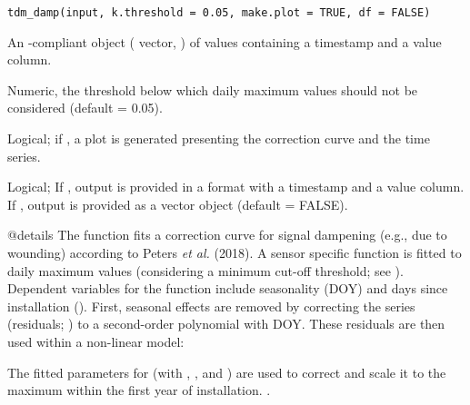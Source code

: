 \documentclass[a4paper]{book}
\begin{document}
%
\begin{Usage}
\begin{verbatim}
tdm_damp(input, k.threshold = 0.05, make.plot = TRUE, df = FALSE)
\end{verbatim}
\end{Usage}
%
\begin{Arguments}
\begin{ldescription}
\item[\code{input}] An -compliant object ( vector, ) of  values containing
a timestamp and a value column.

\item[\code{k.threshold}] Numeric, the threshold below which daily maximum  values should not be considered (default = 0.05).

\item[\code{make.plot}] Logical; if , a plot is generated presenting the correction curve and the  time series.

\item[\code{df}] Logical; If , output is provided in a  format
with a timestamp and a value column. If , output
is provided as a  vector object (default = FALSE).


@details The function fits a correction curve for signal dampening (e.g., due to wounding)
according to Peters \emph{et al.} (2018). A sensor specific function is fitted to daily maximum
 values (considering a minimum cut-off threshold; see ). Dependent variables
for the function include seasonality (DOY) and days since installation ().
First, seasonal effects are removed by correcting the  series (residuals; )
to a second-order polynomial with DOY. These residuals are then used within a
non-linear model:

The fitted parameters for  (with , ,  and ) are used to
correct  and scale it to the maximum within the first year of installation.
.
\end{ldescription}
\end{Arguments}
%
\end{document}
